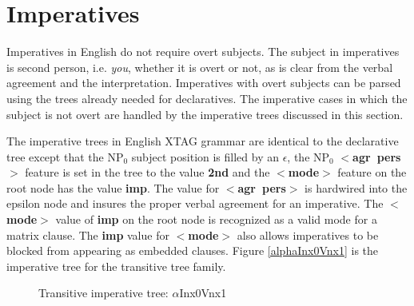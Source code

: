 \chapter{Imperatives}
\label{imperatives}

Imperatives in English do not require overt subjects.  The subject in
imperatives is second person, i.e. {\it you}, whether it is overt or
not, as is clear from the verbal agreement and the interpretation.
Imperatives with overt subjects can be  parsed using the trees already
needed for declaratives.  The imperative cases in which the subject is
not overt are handled by the imperative trees discussed in this section.

The imperative trees in English XTAG grammar are identical to the declarative
tree except that the NP$_{0}$ subject position is filled by an $\epsilon$, the
NP$_{0}$ {\bf $<$agr~pers$>$} feature is set in the tree to the value {\bf 2nd}
and the {\bf $<$mode$>$} feature on the root node has the value {\bf imp}.  The
value for {\bf $<$agr~pers$>$} is hardwired into the epsilon node and insures
the proper verbal agreement for an imperative.  The {\bf $<$mode$>$} value of
{\bf imp} on the root node is recognized as a valid mode for a matrix clause.
The {\bf imp} value for {\bf $<$mode$>$} also allows imperatives to be blocked
from appearing as embedded clauses.  Figure \ref{alphaInx0Vnx1} is the
imperative tree for the transitive tree family.

\begin{figure}[htbp]
\caption{Transitive imperative tree: $\alpha$Inx0Vnx1}
\label{alphaInx0Vnx1}
\label{2;11,1}
\end{figure}

